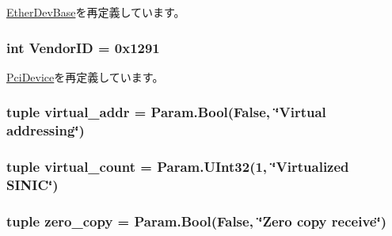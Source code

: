 \hyperlink{classEthernet_1_1EtherDevBase_acce15679d830831b0bbe8ebc2a60b2ca}{EtherDevBase}を再定義しています。\hypertarget{classEthernet_1_1Sinic_a96ec1b4422f12f72160a0633ada47217}{
\subsubsection[{VendorID}]{\setlength{\rightskip}{0pt plus 5cm}int {\bf VendorID} = 0x1291}}
\label{classEthernet_1_1Sinic_a96ec1b4422f12f72160a0633ada47217}


\hyperlink{classPci_1_1PciDevice_a48f611c5f9d4755971b7c867e4529cc6}{PciDevice}を再定義しています。\hypertarget{classEthernet_1_1Sinic_afb2bd0aeeb0bff46f8f6882df3d38041}{
\subsubsection[{virtual\_\-addr}]{\setlength{\rightskip}{0pt plus 5cm}tuple {\bf virtual\_\-addr} = Param.Bool(False, \char`\"{}Virtual addressing\char`\"{})}}
\label{classEthernet_1_1Sinic_afb2bd0aeeb0bff46f8f6882df3d38041}
\hypertarget{classEthernet_1_1Sinic_adda52369cba61872fdec92c0f5eee1b9}{
\subsubsection[{virtual\_\-count}]{\setlength{\rightskip}{0pt plus 5cm}tuple {\bf virtual\_\-count} = Param.UInt32(1, \char`\"{}Virtualized SINIC\char`\"{})}}
\label{classEthernet_1_1Sinic_adda52369cba61872fdec92c0f5eee1b9}
\hypertarget{classEthernet_1_1Sinic_ad152ba2857f68b25cd512c0f19295d92}{
\subsubsection[{zero\_\-copy}]{\setlength{\rightskip}{0pt plus 5cm}tuple {\bf zero\_\-copy} = Param.Bool(False, \char`\"{}Zero copy receive\char`\"{})}}

